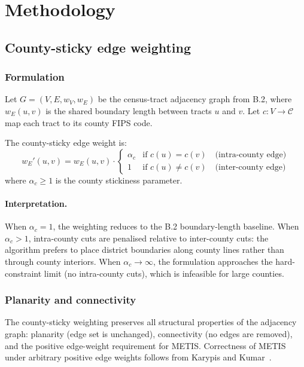 \section{Methodology}
\label{sec:methodology}

\subsection{County-sticky edge weighting}

\subsubsection{Formulation}

Let $G = (V, E, w_V, w_E)$ be the census-tract adjacency graph from B.2,
where $w_E(u, v)$ is the shared boundary length between tracts $u$ and $v$.
Let $c : V \to \mathcal{C}$ map each tract to its county FIPS code.

The county-sticky edge weight is:
\[
  w_E'(u, v) = w_E(u, v) \cdot
  \begin{cases}
    \alpha_c & \text{if } c(u) = c(v) \quad \text{(intra-county edge)} \\
    1        & \text{if } c(u) \neq c(v) \quad \text{(inter-county edge)}
  \end{cases}
\]
where $\alpha_c \geq 1$ is the county stickiness parameter.

\paragraph{Interpretation.}
When $\alpha_c = 1$, the weighting reduces to the B.2 boundary-length
baseline.  When $\alpha_c > 1$, intra-county cuts are penalised relative
to inter-county cuts: the algorithm prefers to place district boundaries
along county lines rather than through county interiors.
When $\alpha_c \to \infty$, the formulation approaches the hard-constraint
limit (no intra-county cuts), which is infeasible for large counties.

\subsubsection{Planarity and connectivity}

The county-sticky weighting preserves all structural properties of the
adjacency graph: planarity (edge set is unchanged), connectivity (no edges
are removed), and the positive edge-weight requirement for METIS.
Correctness of METIS under arbitrary positive edge weights follows from
Karypis and Kumar~\citep{karypis1998}.

